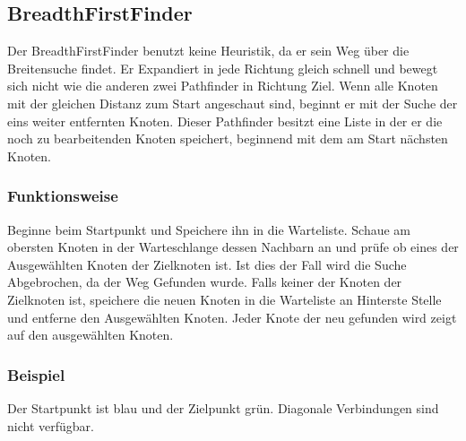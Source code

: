 \subsection{BreadthFirstFinder}

Der BreadthFirstFinder benutzt keine Heuristik, da er sein Weg über die
Breitensuche findet. Er Expandiert in jede Richtung gleich schnell und
bewegt sich nicht wie die anderen zwei Pathfinder in Richtung Ziel. Wenn
alle Knoten mit der gleichen Distanz zum Start angeschaut sind, beginnt
er mit der Suche der eins weiter entfernten Knoten. Dieser Pathfinder
besitzt eine Liste in der er die noch zu bearbeitenden Knoten speichert,
beginnend mit dem am Start nächsten Knoten.
\cite[Brilliant.org]{brilliantbfs}

\subsubsection{Funktionsweise}

Beginne beim Startpunkt und Speichere ihn in die Warteliste. Schaue am
obersten Knoten in der Warteschlange dessen Nachbarn an und prüfe ob
eines der Ausgewählten Knoten der Zielknoten ist. Ist dies der Fall wird
die Suche Abgebrochen, da der Weg Gefunden wurde. Falls keiner der
Knoten der Zielknoten ist, speichere die neuen Knoten in die Warteliste
an Hinterste Stelle und entferne den Ausgewählten Knoten. Jeder Knote
der neu gefunden wird zeigt auf den ausgewählten Knoten.

\subsubsection{Beispiel}

Der Startpunkt ist blau und der Zielpunkt grün. Diagonale Verbindungen sind nicht verfügbar.


